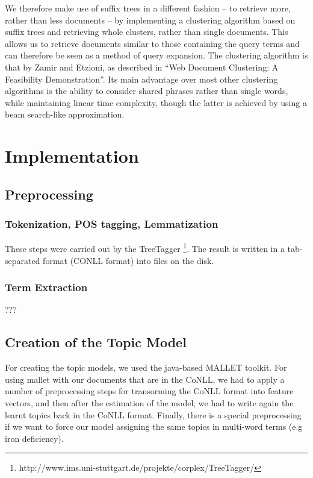 \documentclass[11pt, a4paper, abstraction]{scrartcl}
\begin{document}
We therefore make use of suffix trees in a different fashion -- to retrieve more, rather than less documents -- by implementing a clustering algorithm based on suffix trees and retrieving whole clusters, rather than single documents. This allows us to retrieve documents similar to those containing the query terms and can therefore be seen as a method of query expansion. The clustering algorithm is that by Zamir and Etzioni, as described in ``Web Document Clustering: A Feasibility Demonstration''. Its main advantage over most other clustering algorithms is the ability to consider shared phrases rather than single words, while maintaining linear time complexity, though the latter is achieved by using a beam search-like approximation.

\section{Implementation}

\subsection{Preprocessing}

\subsubsection{Tokenization, POS tagging, Lemmatization}
These steps were carried out by the TreeTagger \footnote{http://www.ims.uni-stuttgart.de/projekte/corplex/TreeTagger/}. The result is written in a tab-separated format (CONLL format) into files on the disk.

\subsubsection{Term Extraction}

???

\subsection{Creation of the Topic Model}

For creating the topic models, we used the java-based MALLET toolkit. For using mallet with our documents that are in the CoNLL, we had to apply a number of preprocessing steps for transorming the CoNLL format into feature vectors, and then after the estimation of the model, we had to write again the learnt topics back in the CoNLL format. Finally, there is a special preprocessing if we want to force our model assigning the same topics in multi-word terms (e.g iron deficiency).
\end{document}
